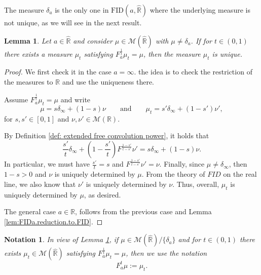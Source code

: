 \documentclass[reqno,11pt]{amsart}
\newtheorem{lemma}[theorem]{Lemma}
\newtheorem{notation}[theorem]{Notation}
\theoremstyle{remark}
\newcommand{\rr}{\mathbb{R}}
\newcommand{\MM}{\mathcal{M}}
\newcommand{\freepower}[1]{F^{#1}}
\newcommand{\pfreepower}[2]{F_{#1}^{#2}}
\begin{document}
The measure $\delta_a$ is the only one in $\text{FID}(a,\hat{\rr})$ where the underlying measure is not unique, as we will see in the next result.

\begin{lemma}
\label{lem:uniqueness.FID}
Let $a\in \hat{\rr}$ and consider $ \mu\in \MM(\hat{\rr}) $ with $\mu\neq \delta_a$. If for $t\in(0,1)$ there exists a measure $\mu_t$ satisfying $ \pfreepower{a}{\tfrac{1}{t}}\mu_t = \mu $, then the measure $\mu_t$ is unique.
\end{lemma}

\begin{proof}
We first check it in the case $a=\infty$. the idea is to check the restriction of the measures to $\rr$ and use the uniqueness there. 

Assume $ \pfreepower{a}{\tfrac{1}{t}}\mu_t = \mu $ and write  
$$ \mu = s\delta_\infty + (1-s)\nu \qquad \text{and} \qquad \mu_t = s'\delta_\infty + (1-s')\nu',$$
for $s,s'\in[0,1]$ and $\nu,\nu'\in \MM(\rr)$. 

By Definition \ref{def: extended free convolution power}, it holds that 
$$\frac{s'}{t}\delta_\infty + \left(1-\frac{s'}{t}\right)\freepower{\frac{1-s'}{t-s'}}\nu' = s\delta_\infty + (1-s)\nu.$$
In particular, we must have $\frac{s'}{t}=s$ and $\freepower{\frac{1-s'}{t-s'}}\nu'= \nu$. 
 Finally, since $\mu\neq \delta_{\infty}$, then $1-s>0$ and $\nu$ is uniquely determined by $\mu$. From the theory of $FID$ on the real line, we also know that $\nu'$ is uniquely determined by $\nu$. Thus, overall, $ \mu_t$ is uniquely determined by $\mu $, as desired. 

The general case $a\in\rr$, follows from the previous case and Lemma \ref{lem:FIDa.reduction.to.FID}.
\end{proof}


\begin{notation}
In view of Lemma \ref{lem:uniqueness.FID}, if $\mu\in \MM(\hat{\rr})/\{\delta_a\}$ and for $t\in(0,1)$ there exists $\mu_t\in \MM(\hat{\rr})$ satisfying $ \pfreepower{a}{\tfrac{1}{t}}\mu_t = \mu $, then we use the notation
$$ \pfreepower{a}{t}\mu:=\mu_t .$$
\end{notation}
\end{document}
